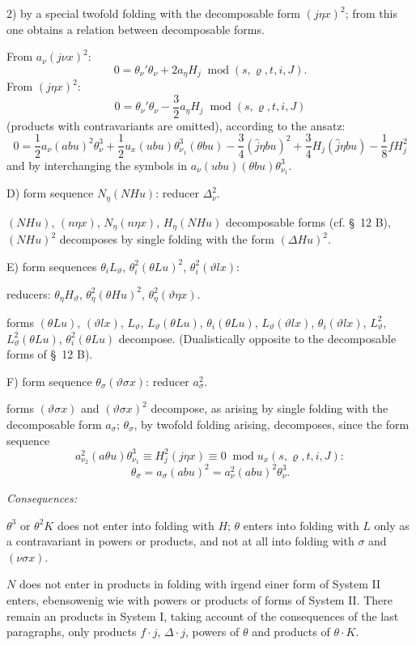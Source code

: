 \documentclass[11pt]{article}
\newcommand{\A}{\Delta}
\newcommand{\R}{\varrho}
\newcommand{\modu}[1]{\;\operatorname{mod} #1}
\begin{document}
2) by a special twofold folding with the decomposable form $(j\eta x)^2$; from this one obtains a relation between decomposable forms.

From $a_\nu(j\nu x)^2$:
\[
0=\theta_\nu'\theta_\nu+2a_\eta H_j\modu{(s,\R,t,i,J)}.
\]
From $(j\eta x)^2$:
\[
0=\theta_\nu'\theta_\nu-\frac32a_\eta H_j\modu{(s,\R,t,i,J)}
\]
(products with contravariants are omitted), according to the ansatz:
\[
0=\frac12a_\nu(abu)^2\theta_\nu^3
+\frac12u_x(ubu)\theta_{\nu_1}^3(\theta bu)
-\frac34(\widehat{j}\eta bu)^2+\frac34H_j(\widehat{j}\eta bu)
-\frac18fH_j^2
\]
and by interchanging the symbols in $a_\nu(ubu)(\theta bu)\theta_{\nu_1}^3$.

\noindent D) form sequence $N_\eta(NHu)$: reducer $\A_\nu^2$.

$(NHu)$, $(n\eta x)$, $N_\eta(n\eta x)$, $H_\eta(NHu)$ decomposable forms (cf. \S\ 12 B), $(NHu)^2$ decomposes by single folding with the form $(\A Hu)^2$.

\noindent E) form sequences $\theta_iL_\vartheta$, $\theta_i^2(\theta Lu)^2$, $\theta_i^2(\vartheta lx)$:

reducers: $\theta_\eta H_\vartheta$, $\theta_\eta^2(\theta Hu)^2$, $\theta_\eta^2(\vartheta\eta x)$.

forms $(\theta Lu)$, $(\vartheta lx)$, $L_\vartheta$, $L_\vartheta(\theta Lu)$, $\theta_i(\theta Lu)$, $L_\vartheta(\vartheta lx)$, $\theta_i(\vartheta lx)$, $L_\vartheta^2$, $L_\vartheta^2(\theta Lu)$, $\theta_i^2(\theta Lu)$ decompose. (Dualistically opposite to the decomposable forms of \S\ 12 B).

\noindent F) form sequence $\theta_\sigma(\vartheta\sigma x)$: reducer $a_\sigma^2$.

forms $(\vartheta\sigma x)$ and $(\vartheta\sigma x)^2$ decompose, as arising by single folding with the decomposable form $a_\sigma$; $\theta_\sigma$, by twofold folding arising, decomposes, since the form sequence
\[
a_{\nu_2}^2(a\theta u)\theta_{\nu_1}^3\equiv H_j^2(j\eta x)\equiv0\modu{u_x(s,\R,t,i,J)}:
\]
\[
\theta_\sigma=a_\sigma(abu)^2=a_\nu^2(abu)^2\theta_\nu^3.
\]

\noindent\emph{Consequences:}

$\theta^3$ or $\theta^2K$ does not enter into folding with $H$; $\theta$ enters into folding with $L$ only as a contravariant in powers or products, and not at all into folding with $\sigma$ and $(\nu\sigma x)$.

$N$ does not enter in products in folding with irgend einer form of System II enters, ebensowenig wie with powers or products of forms of System II. There remain an products in System I, taking account of the consequences of the last paragraphs, only products $f\cdot j$, $\A\cdot j$, powers of $\theta$ and products of $\theta\cdot K$.
\end{document}
